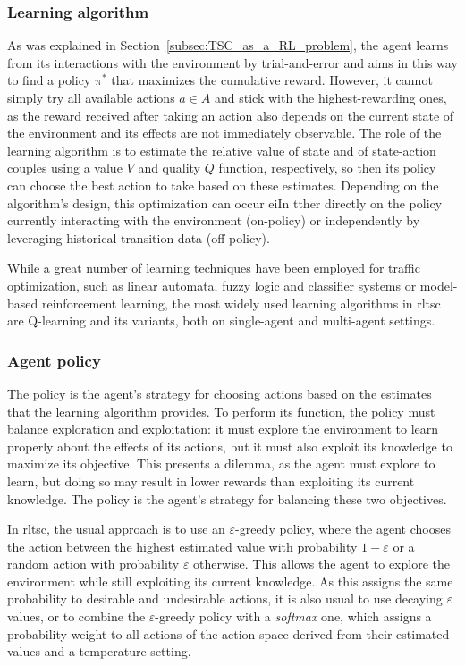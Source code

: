 \subsubsection{Learning algorithm}
As was explained in Section~\ref{subsec:TSC_as_a_RL_problem}, the agent learns from its interactions with the environment by trial-and-error and aims in this way to find a policy $\pi^*$ that maximizes the cumulative reward. However, it cannot simply try all available actions $a \in A$ and stick with the highest-rewarding ones, as the reward received after taking an action also depends on the current state of the environment and its effects are not immediately observable. The role of the learning algorithm is to estimate the relative value of state and of state-action couples using a value $V$ and quality $Q$ function, respectively, so then its policy can choose the best action to take based on these estimates. Depending on the algorithm's design, this optimization can occur eiIn tther directly on the policy currently interacting with the environment (on-policy) or independently by leveraging historical transition data (off-policy).

While a great number of learning techniques have been employed for traffic optimization, such as linear automata, fuzzy logic and classifier systems or model-based reinforcement learning, the most widely used learning algorithms in \gls{rltsc} are Q-learning and its variants, both on single-agent and multi-agent settings.

\subsubsection{Agent policy}
The policy is the agent's strategy for choosing actions based on the estimates that the learning algorithm provides. To perform its function, the policy must balance exploration and exploitation: it must explore the environment to learn properly about the effects of its actions, but it must also exploit its knowledge to maximize its objective. This presents a dilemma, as the agent must explore to learn, but doing so may result in lower rewards than exploiting its current knowledge. The policy is the agent's strategy for balancing these two objectives.

In \gls{rltsc}, the usual approach is to use an $\varepsilon$-greedy policy, where the agent chooses the action between the highest estimated value with probability $1-\varepsilon$ or a random action with probability $\varepsilon$ otherwise. This allows the agent to explore the environment while still exploiting its current knowledge. As this assigns the same probability to desirable and undesirable actions, it is also usual to use decaying $\varepsilon$ values, or to combine the $\varepsilon$-greedy policy with a \textit{softmax} one, which assigns a probability weight to all actions of the action space derived from their estimated values and a temperature setting.

